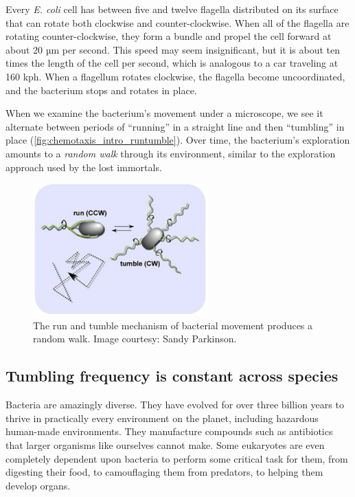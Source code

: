 Every \textit{E. coli} cell has between five and twelve flagella distributed on its surface that can rotate both clockwise and counter-clockwise. When all of the flagella are rotating counter-clockwise, they form a bundle and propel the cell forward at about 20 µm per second. This speed may seem insignificant, but it is about ten times the length of the cell per second, which is analogous to a car traveling at 160 kph. When a flagellum rotates clockwise, the flagella become uncoordinated, and the bacterium stops and rotates in place.

When we examine the bacterium's movement under a microscope, we see it alternate between periods of ``running'' in a straight line and then ``tumbling'' in place (\autoref{fig:chemotaxis_intro_runtumble}). Over time, the bacterium's  exploration amounts to a \textit{random walk} through its environment, similar to the exploration approach used by the lost immortals.

\begin{figure}[h]
\centering
\mySfFamily
\includegraphics[width = 0.6\textwidth]{../images/chemotaxis_intro_runtumble.png}
\caption{The run and tumble mechanism of bacterial movement produces a random walk. Image courtesy: Sandy Parkinson.}
\label{fig:chemotaxis_intro_runtumble}
\end{figure}

\FloatBarrier
{}
\subsection{Tumbling frequency is constant across species}

Bacteria are amazingly diverse. They have evolved for over three billion years to thrive in practically every environment on the planet, including hazardous human-made environments. They manufacture compounds such as antibiotics that larger organisms like ourselves cannot make. Some eukaryotes are even completely dependent upon bacteria to perform some critical task for them, from digesting their food, to camouflaging them from predators, to helping them develop organs.

